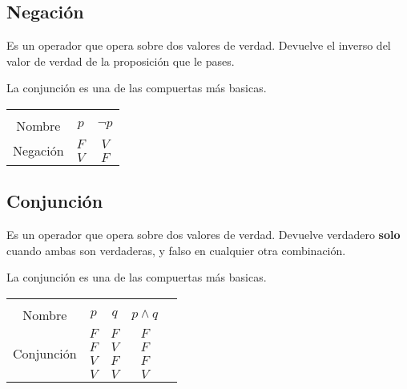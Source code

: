 \documentclass[12pt]{report}                                    %
\begin{document}
        \clearpage
        \subsection{Negación}

            Es un operador que opera sobre dos valores de verdad. Devuelve el 
            inverso del valor de verdad de la proposición que le pases.

            La conjunción es una de las compuertas más basicas. \\

            \begin{tabular}{ |c|c|c| } 
                \hline &&\\
                \large{Nombre} & $p$ & $\lnot p$ \\[0.5em]
                \hline
                \multirow{2}{5em}{Negación}
                & $F$ & $V$  \\ \cline{2-3}
                & $V$ & $F$  \\ \cline{2-3}
                \hline
            \end{tabular}

        \subsection{Conjunción}

            Es un operador que opera sobre dos valores de verdad. Devuelve verdadero
            \textbf{solo} cuando ambas son verdaderas, y falso en cualquier
            otra combinación.

            La conjunción es una de las compuertas más basicas. \\

            \begin{tabular}{ |c|c|c|c|c| } 
                \hline &&&\\
                \large{Nombre} & $p$ & $q$ & $p \land q$ \\[0.5em]
                \hline
                \multirow{4}{5em}{Conjunción}
                & $F$ & $F$ & $F$ \\ \cline{2-4}
                & $F$ & $V$ & $F$ \\ \cline{2-4}
                & $V$ & $F$ & $F$ \\ \cline{2-4}
                & $V$ & $V$ & $V$ \\ 
                \hline
            \end{tabular}
\end{document}

